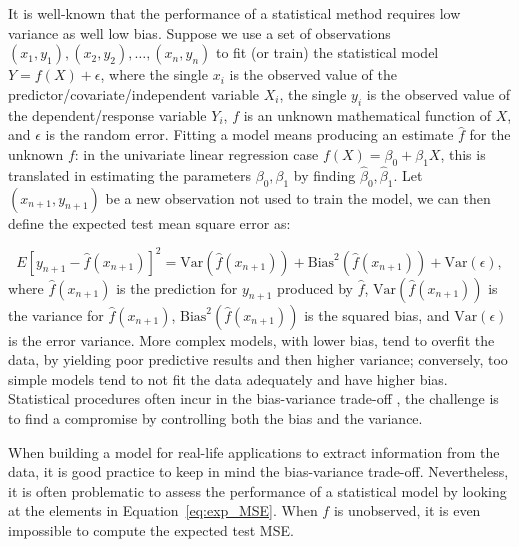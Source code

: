 \documentclass{statsoc}
\begin{document}
It is well-known that the performance of a statistical method requires low variance as well low bias. Suppose we use a set of observations $(x_1,y_1),(x_2,y_2),\ldots,(x_n,y_n)$ to fit (or train) the statistical model $Y=f(X)+\epsilon$, where the single $x_i$ is the observed value of the predictor/covariate/independent variable $X_i$, the single $y_i$ is the observed value of the  dependent/response variable $Y_i$, $f$ is an unknown mathematical function of $X$, and $\epsilon$ is the random error. Fitting a model means producing an estimate $\hat{f}$ for the unknown $f$: in the univariate linear regression case $f(X)= \beta_0+\beta_1X$, this is translated in estimating the parameters $\beta_0,\beta_1$ by finding $\hat{\beta}_0, \hat{\beta}_1$.
Let  $(x_{n+1}, y_{n+1})$ be a new observation not used to train the model, we can then define the expected test mean square error as:

\begin{equation}
E \left[ y_{n+1}-\hat{f}({x}_{n+1}) \right]^2 = \text{Var}(\hat{f}({x}_{n+1}))+ \text{Bias}^2(\hat{f}({x}_{n+1}))+\text{Var}(\epsilon),
\label{eq:exp_MSE}
\end{equation}
%
where $\hat{f}(x_{n+1})$ is the prediction for $y_{n+1}$ produced by $\hat{f}$, $\text{Var}(\hat{f}(x_{n+1}))$ is the variance for $\hat{f}(x_{n+1})$, $\text{Bias}^2(\hat{f}(x_{n+1}))$ is the squared bias, and $\text{Var}(\epsilon)$ is the error variance.
More complex models, with lower bias, tend to overfit the data, by yielding  poor  predictive results and then higher variance; conversely, too simple models tend to not fit the data adequately and have higher bias. Statistical procedures often incur in the bias-variance 
trade-off \citep{james2013introduction}, the challenge is to find a compromise by controlling both the bias and the variance.

When building a model for real-life applications to extract information from the data, it is good practice to keep in mind the bias-variance trade-off. Nevertheless, it is often 
problematic to assess the performance of a statistical model by looking at the elements in Equation~\eqref{eq:exp_MSE}. When $f$ is unobserved, it is even impossible to compute the expected test MSE.
\end{document}
